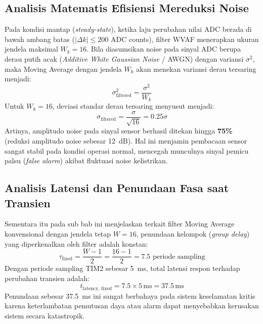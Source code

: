 \documentclass[11pt,a4paper]{article}
\begin{document}
\begin{longtable}
\subsection{Analisis Matematis Efisiensi Mereduksi Noise}
\hspace{1.5em}Pada kondisi mantap (\textit{steady-state}), ketika laju perubahan nilai ADC berada di bawah ambang batas ($|\Delta k| \le 200$ ADC counts), filter WVAF menerapkan ukuran jendela maksimal $W_k = 16$. Bila diasumsikan noise pada sinyal ADC berupa derau putih acak (\textit{Additive White Gaussian Noise} / AWGN) dengan variansi $\sigma^2$, maka Moving Average dengan jendela $W_k$ akan menekan variansi derau tersaring menjadi:
\begin{equation}
\sigma_{\text{filtered}}^2 = \frac{\sigma^2}{W_k}
\end{equation}
Untuk $W_k = 16$, deviasi standar derau tersaring menyusut menjadi:
\begin{equation}
\sigma_{\text{filtered}} = \frac{\sigma}{\sqrt{16}} = 0.25\sigma
\end{equation}
Artinya, amplitudo noise pada sinyal sensor berhasil ditekan hingga \textbf{75\%} (reduksi amplitudo noise sebesar 12~dB). Hal ini menjamin pembacaan sensor sangat stabil pada kondisi operasi normal, mencegah munculnya sinyal pemicu palsu (\textit{false alarm}) akibat fluktuasi noise kelistrikan.

\subsection{Analisis Latensi dan Penundaan Fasa saat Transien}
\hspace{1.5em}Sementara itu pada sub bab ini menjelaskan terkait filter Moving Average konvensional dengan jendela tetap $W = 16$, penundaan kelompok (\textit{group delay}) yang diperkenalkan oleh filter adalah konstan:
\begin{equation}
\tau_{\text{fixed}} = \frac{W - 1}{2} = \frac{16 - 1}{2} = 7.5 \text{ periode sampling}
\end{equation}
Dengan periode sampling TIM2 sebesar 5~ms, total latensi respon terhadap perubahan transien adalah:
\begin{equation}
t_{\text{latency, fixed}} = 7.5 \times 5\,\text{ms} = 37.5\,\text{ms}
\end{equation}
Penundaan sebesar 37.5~ms ini sangat berbahaya pada sistem keselamatan kritis karena keterlambatan pemutusan daya atau alarm dapat menyebabkan kerusakan sistem secara katastropik.


\end{longtable}
\end{document}
